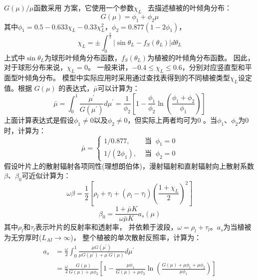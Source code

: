 $G(\mu) / \mu$函数采用 \citet{goudriaan1977crop} 方案，它使用一个参数$\chi_{L}$~\citep{ross1975radiative} 去描述植被的叶倾角分布：
\begin{equation}\label{Gmu}
G(\mu)=\phi_{1}+\phi_{2} \mu
\end{equation}
其中$\phi_{1}=0.5-0.633 \chi_{L}-0.33 \chi_{L}^{2}$，$\phi_{2}=0.877\left(1-2 \phi_{1}\right)$，
\begin{equation}
\chi_{L}=\pm \int_{0}^{\frac{\pi}{2}}\left|\sin \theta_{L}-f_{S}\left(\theta_{L}\right)\right| d \theta_{L}
\end{equation}
上式中$\sin \theta_{L}$为球形叶倾角分布函数，$f_{S}\left(\theta_{L}\right)$为植被的叶倾角分布函数。
因此，对于球形分布来说，$\chi_{L}=0$。 一般来讲，$-0.4 \leqslant \chi_{L} \leqslant 0.6$，分别对应竖直型和平面型叶倾角分布。
模型中实际应用时采用通过查找表得到的不同植被类型$\chi_{L}$设定值。根据 $G(\mu)$ 的表达式，$\bar{\mu}$可以计算为：
\begin{equation}
\bar{\mu}=\int_{0}^{1} \frac{\mu^{\prime}}{G\left(\mu^{\prime}\right)}
 d \mu^{\prime}=\frac{1}{\phi_{2}}\left[1-\frac{\phi_{1}}{\phi_{2}}
 \ln \left(\frac{\phi_{1}+\phi_{2}}{\phi_{1}}\right)\right]
\end{equation}
上面计算表达式是假设$\phi_{1} \neq 0$以及$\phi_{2} \neq 0$，但实际上两者均可为0 \citep{dai2004two}。当$\phi_{1}$、$\phi_{2}$为0时，计算为：
\begin{equation}
\bar{\mu}= \begin{cases} 
1 / 0.877, & \text { 当 }\ \phi_{1}=0 \\
1 /\left(2 \phi_{1}\right), & \text { 当 }\ \phi_{2}=0
\end{cases}
\end{equation}
假设叶片上的散射辐射各项同性(理想朗伯体)，漫射辐射和直射辐射向上散射系数$\beta$、$\beta_0$可近似计算为：
\begin{equation}
\omega \beta=\frac{1}{2}\left[\rho_{l}+\tau_{l}+\left(\rho_{l}-\tau_{l}\right)\left(\frac{1+\chi_{L}}{2}\right)^{2}\right]
\end{equation}
%
\begin{equation}\label{beta0}
\beta_{0}=\frac{1+\bar{\mu} K}{\omega \bar{\mu} K} a_{s}(\mu)
\end{equation}
其中$\rho_l$和$\tau_l$表示叶片的反射率和透射率，
并依赖于波段，$\omega=\rho_l+\tau_l$。$a_s$为当植被为无穷厚时($L_{AI}\rightarrow\infty$)，
整个植被的单次散射反照率，计算为：
\begin{equation}
\begin{aligned} 
a_{s} &=\frac{\omega}{2} \int_{0}^{1} \frac{\mu G\left(\mu^{\prime}\right)}{\mu G\left(\mu^{\prime}\right)+\mu^{\prime} 
G(\mu)} d \mu^{\prime} \\[1ex]
&=\frac{\omega}{2} \frac{G(\mu)}{G(\mu)+\mu \phi_{2}}\left[1-\frac{\mu \phi_{1}}{G(\mu)+\mu \phi_{2}} 
\ln \left(\frac{G(\mu)+\mu \phi_{1}+\mu \phi_{2}}{\mu \phi_{1}}\right)\right] 
\end{aligned}
\end{equation}


